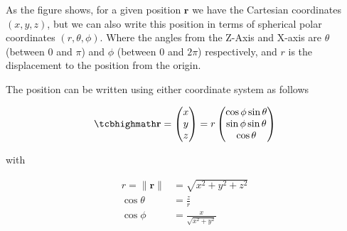 As the figure shows, for a given position $\mathbf{r}$ we have the Cartesian coordinates $({x},{y},{z})$, but we can also write this position in terms of spherical polar coordinates $(r,\theta,\phi)$.
Where the angles from the Z-Axis and X-axis are $\theta$ (between 0 and $\pi$) and $\phi$ (between 0 and $2\pi$) respectively, and ${r}$ is the displacement to the position from the origin.

The position can be written using either coordinate system as follows

\begin{equation}
	\mhl{
		\mathbf{r} =
		\begin{pmatrix}
			x \\
			y \\
			z \\
		\end{pmatrix}
		= r
		\begin{pmatrix}
			\cos{\phi}\sin{\theta} \\
			\sin{\phi}\sin{\theta} \\
			\cos{\theta}           \\
		\end{pmatrix}
	}
\end{equation}

with

\begin{equation}
	\begin{aligned}
		r = \|\mathbf{r}\| & =\sqrt{x^2 + y^2 + z^2}      \\
		\cos\theta         & = \frac{z}{r}                \\
		\cos\phi           & = \frac{x}{\sqrt{x^2 + y^2}}
	\end{aligned}
\end{equation}





